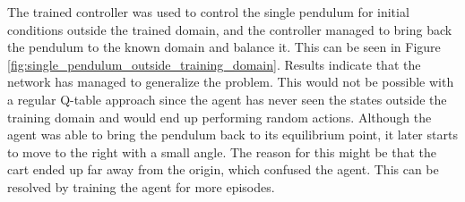 \documentclass[final]{LTHtwocol} %
\begin{document}
The trained controller was used to control the single pendulum for initial conditions outside the trained domain, and the controller managed to bring back the pendulum to the known domain and balance it.
This can be seen in Figure \ref{fig:single_pendulum_outside_training_domain}.
Results indicate that the network has managed to generalize the problem.
This would not be possible with a regular Q-table approach since the agent has never seen the states outside the training domain and would end up performing random actions.
Although the agent was able to bring the pendulum back to its equilibrium point, it later starts to move to the right with a small angle.
The reason for this might be that the cart ended up far away from the origin, which confused the agent.
This can be resolved by training the agent for more episodes.
\end{document}
